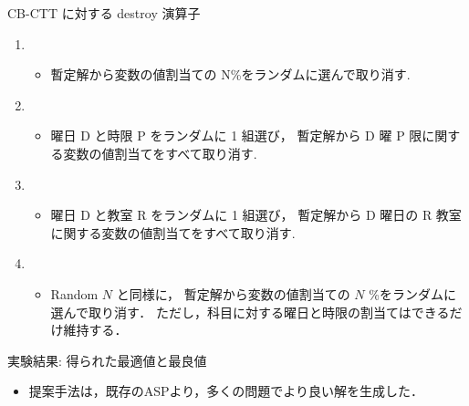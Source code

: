 \documentclass[11pt,dvipdfmx]{beamer}
\begin{document}
\begin{frame}{CB-CTT に対する destroy 演算子}

  \begin{block}{}
    \begin{enumerate}
    \item {}
      \begin{itemize}
      \item 暫定解から変数の値割当ての N\%をランダムに選んで取り消す.
      \end{itemize}
    \item {}
      \begin{itemize}
      \item 曜日 D と時限 P をランダムに 1 組選び，
      暫定解から D 曜 P 限に関する変数の値割当てをすべて取り消す.
   \end{itemize}
  \item {}
   \begin{itemize}
   \item 曜日 D と教室 R をランダムに 1 組選び，
   暫定解から D 曜日の R 教室に関する変数の値割当てをすべて取り消す.
   \end{itemize}
  \item {}
   \begin{itemize}
    \item Random $N$ と同様に，
    暫定解から変数の値割当ての $N$ \%をランダムに選んで取り消す．
    ただし，科目に対する曜日と時限の割当てはできるだけ維持する．
   \end{itemize}
  \end{enumerate}
  \end{block}
\end{frame}
\begin{frame}{実験結果: 得られた最適値と最良値}
  \begin{tableA}
    
  \end{tableA}
  \begin{itemize}
  \item 提案手法は，既存のASPより，多くの問題でより良い解を生成した．
  \end{itemize}
\end{frame}
\end{document}
